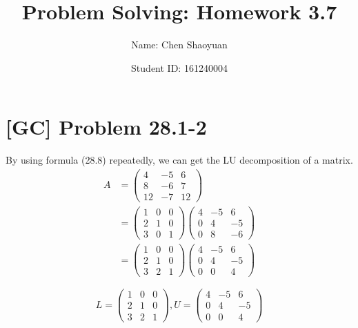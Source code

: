 \documentclass[a4paper,11pt]{article}
\newcommand{\homeworkno}{3.7}
\begin{document}
  \title{Problem Solving: Homework \homeworkno}
  \author{Name: Chen Shaoyuan \and Student ID: 161240004}
  \maketitle

  \section{[GC] Problem 28.1-2}
  By using formula (28.8) repeatedly, we can get the LU decomposition of a matrix.
  \begin{align*}
    A &= \begin{pmatrix}
           4 & -5 & 6 \\
           8 & -6 & 7 \\
           12 & -7 & 12
         \end{pmatrix} \\
      &= \begin{pmatrix}
           1 & 0 & 0 \\
           2 & 1 & 0 \\
           3 & 0 & 1
         \end{pmatrix}
         \begin{pmatrix}
           4 & -5 & 6 \\
           0 & 4 & -5 \\
           0 & 8 & -6
         \end{pmatrix} \\
      &= \begin{pmatrix}
           1 & 0 & 0 \\
           2 & 1 & 0 \\
           3 & 2 & 1
         \end{pmatrix}
         \begin{pmatrix}
           4 & -5 & 6 \\
           0 & 4 & -5 \\
           0 & 0 & 4
         \end{pmatrix}
  \end{align*}

  $$ L = \begin{pmatrix}
           1 & 0 & 0 \\
           2 & 1 & 0 \\
           3 & 2 & 1
         \end{pmatrix},
     U = \begin{pmatrix}
           4 & -5 & 6 \\
           0 & 4 & -5 \\
           0 & 0 & 4
         \end{pmatrix} $$
\end{document}
